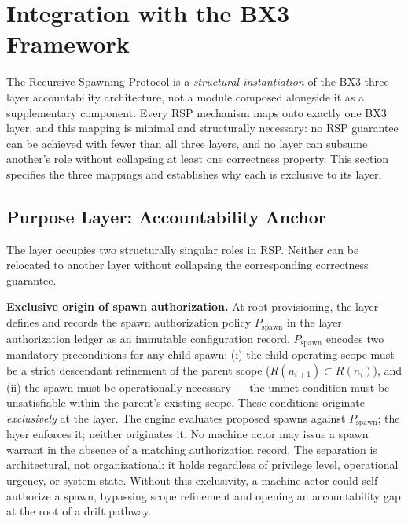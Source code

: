 \section{Integration with the BX3 Framework}
\label{sec:rs-integration}

The Recursive Spawning Protocol is a \emph{structural instantiation} of the BX3 three-layer accountability architecture, not a module composed alongside it as a supplementary component. Every RSP mechanism maps onto exactly one BX3 layer, and this mapping is minimal and structurally necessary: no RSP guarantee can be achieved with fewer than all three layers, and no layer can subsume another's role without collapsing at least one correctness property. This section specifies the three mappings and establishes why each is exclusive to its layer.

\subsection{Purpose Layer: Accountability Anchor}
\label{sec:rs-purpose-anchor}

The \purpose{} layer occupies two structurally singular roles in RSP. Neither can be relocated to another layer without collapsing the corresponding correctness guarantee.

\medskip
\noindent\textbf{Exclusive origin of spawn authorization.} At root provisioning, the \purpose{} layer defines and records the spawn authorization policy $P_{\mathrm{spawn}}$ in the \fact{} layer authorization ledger as an immutable configuration record. $P_{\mathrm{spawn}}$ encodes two mandatory preconditions for any child spawn: (i) the child operating scope must be a strict descendant refinement of the parent scope ($R(n_{i+1}) \subset R(n_i)$), and (ii) the spawn must be operationally necessary --- the unmet condition must be unsatisfiable within the parent's existing scope. These conditions originate \emph{exclusively} at the \purpose{} layer. The \bounds{} engine evaluates proposed spawns against $P_{\mathrm{spawn}}$; the \fact{} layer enforces it; neither originates it. No machine actor may issue a spawn warrant in the absence of a matching \purpose{} authorization record. The separation is architectural, not organizational: it holds regardless of privilege level, operational urgency, or system state. Without this exclusivity, a machine actor could self-authorize a spawn, bypassing scope refinement and opening an accountability gap at the root of a drift pathway.

